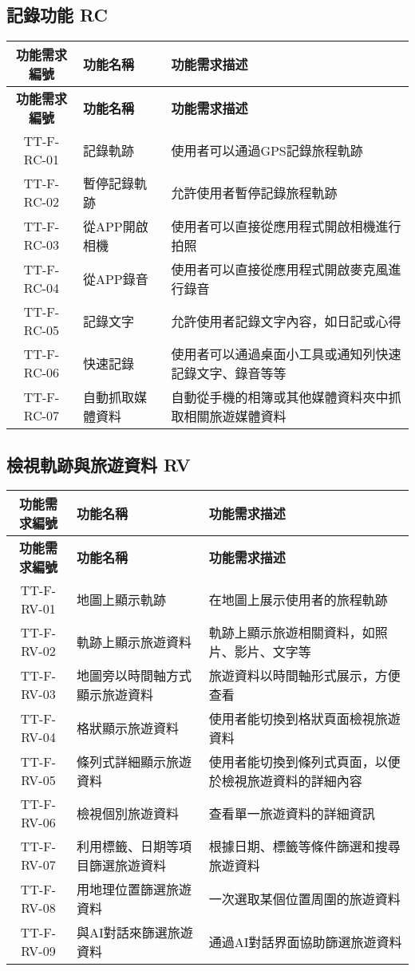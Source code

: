 \documentclass[12pt]{article}
\begin{document}
\subsection{記錄功能 RC}

\begin{longtable}{|c|p{4.3cm}|p{8.9cm}|}
  \hline
  \textbf{功能需求編號} & \textbf{功能名稱} & \textbf{功能需求描述} \\
  \hline
  \endfirsthead
  \hline
  \textbf{功能需求編號} & \textbf{功能名稱} & \textbf{功能需求描述} \\
  \hline
  \endhead
  TT-F-RC-01 & 記錄軌跡 & 使用者可以通過GPS記錄旅程軌跡 \\
  \hline
  TT-F-RC-02 & 暫停記錄軌跡 & 允許使用者暫停記錄旅程軌跡 \\
  \hline
  TT-F-RC-03 & 從APP開啟相機 & 使用者可以直接從應用程式開啟相機進行拍照 \\
  \hline
  TT-F-RC-04 & 從APP錄音 & 使用者可以直接從應用程式開啟麥克風進行錄音 \\
  \hline
  TT-F-RC-05 & 記錄文字 & 允許使用者記錄文字內容，如日記或心得 \\
  \hline
  TT-F-RC-06 & 快速記錄 & 使用者可以通過桌面小工具或通知列快速記錄文字、錄音等等 \\
  \hline
  TT-F-RC-07 & 自動抓取媒體資料 & 自動從手機的相簿或其他媒體資料夾中抓取相關旅遊媒體資料 \\
  \hline
\end{longtable}


\subsection{檢視軌跡與旅遊資料 RV}

\begin{longtable}{|c|p{4.3cm}|p{8.9cm}|}
  \hline
  \textbf{功能需求編號} & \textbf{功能名稱} & \textbf{功能需求描述} \\
  \hline
  \endfirsthead
  \hline
  \textbf{功能需求編號} & \textbf{功能名稱} & \textbf{功能需求描述} \\
  \hline
  \endhead
  TT-F-RV-01 & 地圖上顯示軌跡 & 在地圖上展示使用者的旅程軌跡 \\
  \hline
  TT-F-RV-02 & 軌跡上顯示旅遊資料 & 軌跡上顯示旅遊相關資料，如照片、影片、文字等 \\
  \hline
  TT-F-RV-03 & 地圖旁以時間軸方式顯示旅遊資料 & 旅遊資料以時間軸形式展示，方便查看 \\
  \hline
  TT-F-RV-04 & 格狀顯示旅遊資料 & 使用者能切換到格狀頁面檢視旅遊資料 \\
  \hline
  TT-F-RV-05 & 條列式詳細顯示旅遊資料 & 使用者能切換到條列式頁面，以便於檢視旅遊資料的詳細內容 \\
  \hline
  TT-F-RV-06 & 檢視個別旅遊資料 & 查看單一旅遊資料的詳細資訊 \\
  \hline
  TT-F-RV-07 & 利用標籤、日期等項目篩選旅遊資料 & 根據日期、標籤等條件篩選和搜尋旅遊資料 \\
  \hline
  TT-F-RV-08 & 用地理位置篩選旅遊資料 & 一次選取某個位置周圍的旅遊資料 \\
  \hline
  TT-F-RV-09 & 與AI對話來篩選旅遊資料 & 通過AI對話界面協助篩選旅遊資料 \\
  \hline
\end{longtable}
\end{document}
